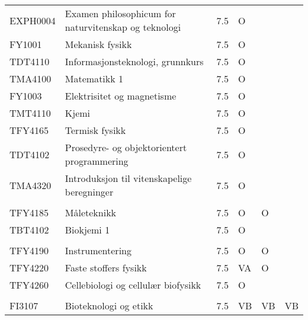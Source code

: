 \documentclass{article}
\begin{document}
\begin{table}[]
\begin{tabular}{llllll}
EXPH0004 & Examen philosophicum for naturvitenskap og teknologi               & 7.5 & O  &    &    \\
FY1001   & Mekanisk   fysikk                                                  & 7.5 & O  &    &    \\
TDT4110  & Informasjonsteknologi,   grunnkurs                                 & 7.5 & O  &    &    \\
TMA4100  & Matematikk 1                                                       & 7.5 & O  &    &    \\
FY1003   & Elektrisitet   og magnetisme                                       & 7.5 & O  &    &    \\
TMT4110  & Kjemi                                                              & 7.5 & O  &    &    \\
TFY4165  & Termisk   fysikk                                                   & 7.5 & O  &    &    \\
TDT4102  & Prosedyre-   og objektorientert programmering                      & 7.5 & O  &    &    \\
TMA4320  & Introduksjon   til vitenskapelige beregninger                      & 7.5 & O  &    &    \\
         &                                                                    &     &    &    &    \\
TFY4185  & Måleteknikk                                                        & 7.5 & O  & O  &    \\
TBT4102  & Biokjemi 1                                                         & 7.5 & O  &    &    \\
         &                                                                    &     &    &    &    \\
TFY4190  & Instrumentering                                                    & 7.5 & O  & O  &    \\
TFY4220  & Faste   stoffers fysikk                                            & 7.5 & VA & O  &    \\
TFY4260  & Cellebiologi   og cellulær biofysikk                               & 7.5 & O  &    &    \\
         &                                                                    &     &    &    &    \\
FI3107   & Bioteknologi   og etikk                                            & 7.5 & VB & VB & VB \\

\end{tabular}
\end{table}
\end{document}
